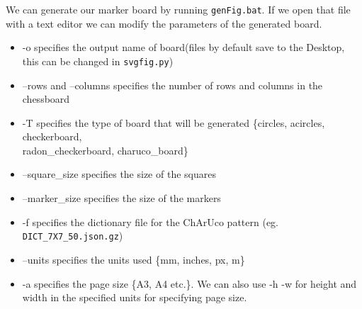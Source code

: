 We can generate our marker board by running \texttt{genFig.bat}. If we open that file with a text editor we can modify the parameters of the generated board.
\begin{itemize}
    \item -o specifies the output name of board(files by default save to the Desktop, this can be changed in \texttt{svgfig.py})

    \item --rows and --columns specifies the number of rows and columns in the chessboard

    \item -T specifies the type of board that will be generated \{circles, acircles, checkerboard, \\radon\_checkerboard, charuco\_board\}

    \item --square\_size specifies the size of the squares

    \item --marker\_size specifies the size of the markers

    \item -f specifies the dictionary file for the ChArUco pattern (eg. \texttt{DICT\_7X7\_50.json.gz}) 

    \item --units specifies the units used \{mm, inches, px, m\}

    \item -a specifies the page size \{A3, A4 etc.\}. We can also use -h -w for height and width in the specified units for specifying page size. 
    
\end{itemize}